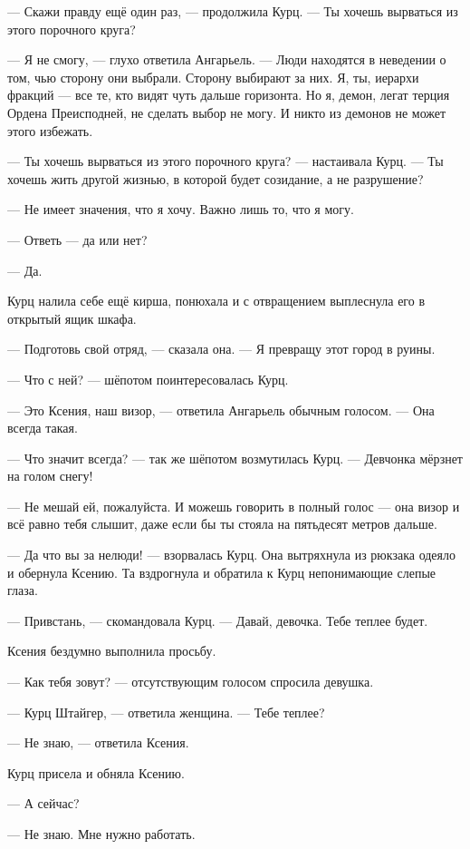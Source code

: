 --- Скажи правду ещё один раз, --- продолжила Курц.
--- Ты хочешь вырваться из этого порочного круга?

--- Я не смогу, --- глухо ответила Ангарьель.
--- Люди находятся в неведении о том, чью сторону они выбрали.
Сторону выбирают за них.
Я, ты, иерархи фракций --- все те, кто видят чуть дальше горизонта.
Но я, демон, легат терция Ордена Преисподней, не сделать выбор не могу.
И никто из демонов не может этого избежать.

--- Ты хочешь вырваться из этого порочного круга? --- настаивала Курц.
--- Ты хочешь жить другой жизнью, в которой будет созидание, а не разрушение?

--- Не имеет значения, что я хочу.
Важно лишь то, что я могу.

--- Ответь --- да или нет?

--- Да.

Курц налила себе ещё кирша, понюхала и с отвращением выплеснула его в открытый ящик шкафа.

--- Подготовь свой отряд, --- сказала она.
--- Я превращу этот город в руины.

\asterism

--- Что с ней? --- шёпотом поинтересовалась Курц.

--- Это Ксения, наш визор, --- ответила Ангарьель обычным голосом.
--- Она всегда такая.

--- Что значит всегда? --- так же шёпотом возмутилась Курц.
--- Девчонка мёрзнет на голом снегу!

--- Не мешай ей, пожалуйста.
И можешь говорить в полный голос --- она визор и всё равно тебя слышит, даже если бы ты стояла на пятьдесят метров дальше.

--- Да что вы за нелюди! --- взорвалась Курц.
Она вытряхнула из рюкзака одеяло и обернула Ксению.
Та вздрогнула и обратила к Курц непонимающие слепые глаза.

--- Привстань, --- скомандовала Курц.
--- Давай, девочка.
Тебе теплее будет.

Ксения бездумно выполнила просьбу.

--- Как тебя зовут? --- отсутствующим голосом спросила девушка.

--- Курц Штайгер, --- ответила женщина.
--- Тебе теплее?

--- Не знаю, --- ответила Ксения.

Курц присела и обняла Ксению.

--- А сейчас?

--- Не знаю.
Мне нужно работать.

